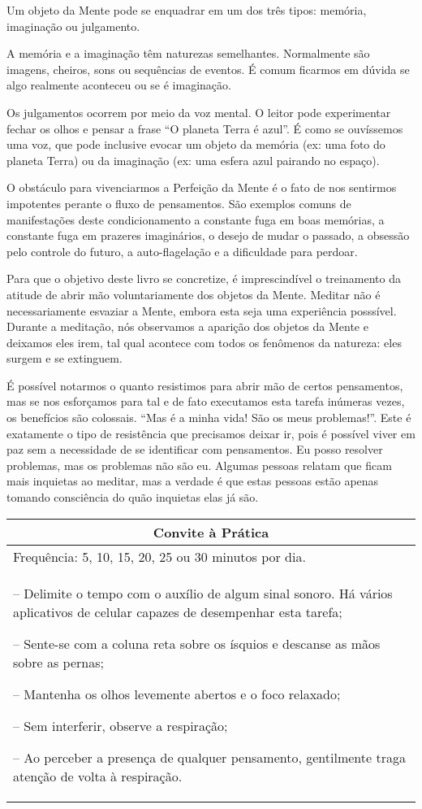 \documentclass[oneside, 12pt]{book}
\newenvironment{prat}[1]
{\begin{center}
\begin{tabular}{p{0.9\textwidth}}
\hline\hline
\multicolumn{1}{c}{Convite à Prática}\\
\hline
Frequência: #1.\\
\hline
}{\\
\hline\hline
\end{tabular} 
\end{center}}
\begin{document}
Um objeto da Mente pode se enquadrar em um dos três tipos: memória, imaginação ou julgamento.

A memória e a imaginação têm naturezas semelhantes. Normalmente são imagens, cheiros, sons ou sequências de eventos. É comum ficarmos em dúvida se algo realmente aconteceu ou se é imaginação.

Os julgamentos ocorrem por meio da voz mental. O leitor pode experimentar fechar os olhos e pensar a frase ``O planeta Terra é azul''. É como se ouvíssemos uma voz, que pode inclusive evocar um objeto da memória (ex: uma foto do planeta Terra) ou da imaginação (ex: uma esfera azul pairando no espaço).

O obstáculo para vivenciarmos a Perfeição da Mente é o fato de nos sentirmos impotentes perante o fluxo de pensamentos. São exemplos comuns de manifestações deste condicionamento a constante fuga em boas memórias, a constante fuga em prazeres imaginários, o desejo de mudar o passado, a obsessão pelo controle do futuro, a auto-flagelação e a dificuldade para perdoar.

Para que o objetivo deste livro se concretize, é imprescindível o treinamento da atitude de abrir mão voluntariamente dos objetos da Mente. Meditar não é necessariamente esvaziar a Mente, embora esta seja uma experiência posssível. Durante a meditação, nós observamos a aparição dos objetos da Mente e deixamos eles irem, tal qual acontece com todos os fenômenos da natureza: eles surgem e se extinguem.

É possível notarmos o quanto resistimos para abrir mão de certos pensamentos, mas se nos esforçamos para tal e de fato executamos esta tarefa inúmeras vezes, os benefícios são colossais. ``Mas é a minha vida! São os meus problemas!''. Este é exatamente o tipo de resistência que precisamos deixar ir, pois é possível viver em paz sem a necessidade de se identificar com pensamentos. Eu posso resolver problemas, mas os problemas não são eu. Algumas pessoas relatam que ficam mais inquietas ao meditar, mas a verdade é que estas pessoas estão apenas tomando consciência do quão inquietas elas já são.

\begin{prat}{5, 10, 15, 20, 25 ou 30 minutos por dia}
-- Delimite o tempo com o auxílio de algum sinal sonoro. Há vários aplicativos de celular capazes de desempenhar esta tarefa;

-- Sente-se com a coluna reta sobre os ísquios e descanse as mãos sobre as pernas;

-- Mantenha os olhos levemente abertos e o foco relaxado;

-- Sem interferir, observe a respiração;

-- Ao perceber a presença de qualquer pensamento, gentilmente traga atenção de volta à respiração.
\end{prat}
\end{document}
